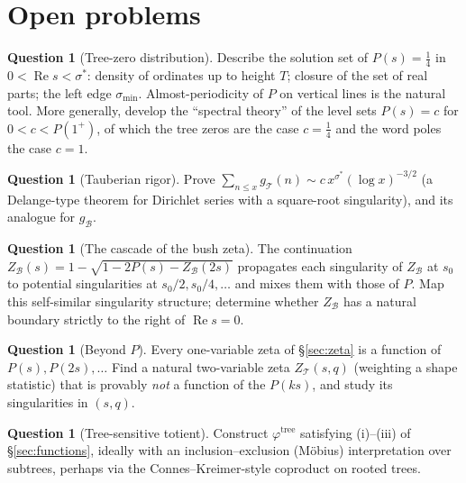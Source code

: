 \documentclass[11pt]{article}
\newcommand{\cT}{\mathcal{T}}   %
\newcommand{\cB}{\mathcal{B}}   %
\numberwithin{equation}{section}
\theoremstyle{plain}
\theoremstyle{definition}
\newtheorem{question}[theorem]{Question}
\theoremstyle{remark}
\begin{document}
\section{Open problems}\label{sec:open}

\begin{question}[Tree-zero distribution]\label{prob:zeros}
Describe the solution set of $P(s) = \tfrac14$ in $0 < \operatorname{Re} s < \sigma^{*}$:
density of ordinates up to height $T$; closure of the set of real parts; the left edge
$\sigma_{\min}$. Almost-periodicity of $P$ on vertical lines is the natural tool. More
generally, develop the ``spectral theory'' of the level sets $P(s) = c$ for
$0 < c < P(1^{+})$, of which the tree zeros are the case $c = \tfrac14$ and the word
poles the case $c = 1$.
\end{question}

\begin{question}[Tauberian rigor]\label{prob:tauberian}
Prove $\sum_{n \le x} g_\cT(n) \sim c\, x^{\sigma^{*}} (\log x)^{-3/2}$ (a Delange-type
theorem for Dirichlet series with a square-root singularity), and its analogue for
$g_\cB$.
\end{question}

\begin{question}[The cascade of the bush zeta]\label{prob:cascade}
The continuation $Z_\cB(s) = 1 - \sqrt{1 - 2P(s) - Z_\cB(2s)}$ propagates each
singularity of $Z_\cB$ at $s_0$ to potential singularities at $s_0/2, s_0/4, \dots$ and
mixes them with those of $P$. Map this self-similar singularity structure; determine
whether $Z_\cB$ has a natural boundary strictly to the right of
$\operatorname{Re} s = 0$.
\end{question}

\begin{question}[Beyond $P$]\label{prob:twovar}
Every one-variable zeta of \S\ref{sec:zeta} is a function of $P(s), P(2s), \dots$ Find a
natural two-variable zeta $Z_\cT(s,q)$ (weighting a shape statistic) that is provably
\emph{not} a function of the $P(ks)$, and study its singularities in $(s,q)$.
\end{question}

\begin{question}[Tree-sensitive totient]\label{prob:totient}
Construct $\varphi^{\mathrm{tree}}$ satisfying (i)--(iii) of \S\ref{sec:functions},
ideally with an inclusion--exclusion (M\"obius) interpretation over subtrees, perhaps
via the Connes--Kreimer-style coproduct on rooted trees.
\end{question}
\end{document}
